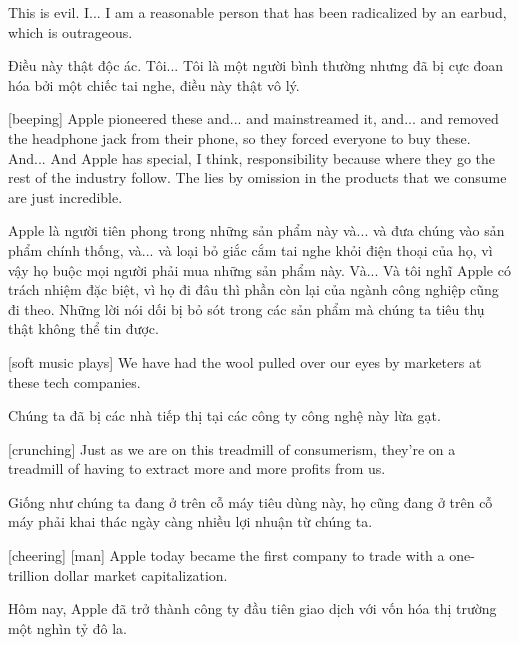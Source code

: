 \documentclass[a4paper]{article}
\begin{document}
	
	This is evil.
	I... I am a reasonable person that has been radicalized by an earbud, which is outrageous.
	
	\begin{vietnamese-v2}
		Điều này thật độc ác.
		Tôi... Tôi là một người bình thường nhưng đã bị cực đoan hóa bởi một chiếc tai nghe, điều này thật vô lý.
	\end{vietnamese-v2}
	
	
	[beeping]
	Apple pioneered these and... and mainstreamed it, and... and removed the headphone jack from their phone, so they forced everyone to buy these.
	And... And Apple has special, I think, responsibility because where they go the rest of the industry follow.
	The lies by omission in the products that we consume are just incredible.
	
	\begin{vietnamese-v2}
		[bíp]
		Apple là người tiên phong trong những sản phẩm này và... và đưa chúng vào sản phẩm chính thống, và... và loại bỏ giắc cắm tai nghe khỏi điện thoại của họ, vì vậy họ buộc mọi người phải mua những sản phẩm này.
		Và... Và tôi nghĩ Apple có trách nhiệm đặc biệt, vì họ đi đâu thì phần còn lại của ngành công nghiệp cũng đi theo.
		Những lời nói dối bị bỏ sót trong các sản phẩm mà chúng ta tiêu thụ thật không thể tin được.
	\end{vietnamese-v2}
	
	[soft music plays]
	We have had the wool pulled over our eyes by marketers at these tech companies.
	
	\begin{vietnamese-v2}
		Chúng ta đã bị các nhà tiếp thị tại các công ty công nghệ này lừa gạt.
	\end{vietnamese-v2}
	
	[crunching]
	Just as we are on this treadmill of consumerism, they're on a treadmill of having to extract more and more profits from us.
	
	\begin{vietnamese-v2}
		Giống như chúng ta đang ở trên cỗ máy tiêu dùng này, họ cũng đang ở trên cỗ máy phải khai thác ngày càng nhiều lợi nhuận từ chúng ta.
	\end{vietnamese-v2}
	
	[cheering]
	[man] Apple today became the first company to trade with a one-trillion dollar market capitalization.
	
	\begin{vietnamese-v2}
		 Hôm nay, Apple đã trở thành công ty đầu tiên giao dịch với vốn hóa thị trường một nghìn tỷ đô la.
	\end{vietnamese-v2}
	
\end{document}
